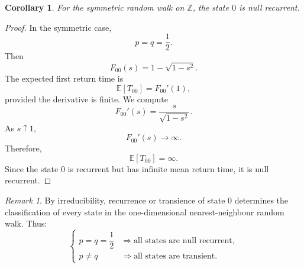\documentclass[11pt]{article}
\theoremstyle{plain}
\newtheorem{corollary}[theorem]{Corollary}
\theoremstyle{definition}
\theoremstyle{remark}
\newtheorem{remark}[theorem]{Remark}
\begin{document}
	\begin{corollary}
		For the symmetric random walk on \(\mathbb{Z}\), the state \(0\) is null recurrent.
	\end{corollary}
	
	\begin{proof}
		In the symmetric case,
		\[
		p=q=\frac12.
		\]
		Then
		\[
		F_{00}(s)
		=
		1-\sqrt{1-s^2}.
		\]
		The expected first return time is
		\[
		\mathbb{E}[T_{00}]
		=
		F_{00}'(1),
		\]
		provided the derivative is finite. We compute
		\[
		F_{00}'(s)
		=
		\frac{s}{\sqrt{1-s^2}}.
		\]
		As \(s\uparrow 1\),
		\[
		F_{00}'(s)\to\infty.
		\]
		Therefore,
		\[
		\mathbb{E}[T_{00}]=\infty.
		\]
		Since the state \(0\) is recurrent but has infinite mean return time, it is null recurrent.
	\end{proof}
	
	\begin{remark}
		By irreducibility, recurrence or transience of state \(0\) determines the classification of every state in the one-dimensional nearest-neighbour random walk. Thus:
		\[
		\begin{cases}
			p=q=\dfrac12
			&\Rightarrow \text{all states are null recurrent},\\[8pt]
			p\neq q
			&\Rightarrow \text{all states are transient}.
		\end{cases}
		\]
	\end{remark}
	
	
\end{document}
